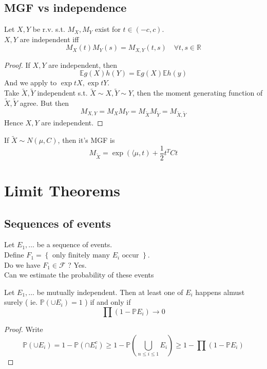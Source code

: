 \documentclass[../main.tex]{subfiles}
\begin{document}
\subsection{MGF vs independence}
\begin{propo}
Let $X,Y$ be r.v. s.t. $M_X,M_Y$ exist for $t\in ( -c,c) $.\\
$X,Y$ are independent iff
\[ 
M_X( t) M_Y( s) = M_{X,Y} ( t,s) \quad \forall t,s\in \mathbb{R}
\]

\end{propo}
\begin{proof}
If $X,Y$ are independent, then 
\[ 
\mathbb{E}g( X) h( Y) = \mathbb{E}g( X) \mathbb{E}h( y) 
\]
And we apply to $\exp tX, \exp tY$.\\
Take $\tilde X, \tilde Y$ independent s.t. $\tilde X\sim X,\tilde Y \sim Y$, then the moment generating function of $\tilde X,\tilde Y$ agree.
But then
\[ 
M_{X,Y} = M_X M_Y= M_{\tilde X} M_{\tilde Y} = M_{\tilde X,\tilde Y} 
\]
Hence $X,Y$ are independent.
\end{proof}
\begin{propo}
If $\tilde X\sim N( \mu,C) $, then it's MGF is
\[ 
M_{\tilde X} = \exp( \langle\mu,t) + \frac{1}{2} t^{T}Ct
\]

\end{propo}
\section{Limit Theorems}
\subsection{Sequences of events}
Let $E_1,\ldots$ be a sequence of events.\\
Define $F_1= \left\{ \text{ only finitely many  } E_i \text{ occur }  \right\} $.\\
Do we have $F_1\in \mathcal{F}$ ?
Yes.\\
Can we estimate the probability of these events
\begin{lemma}
Let $E_1,\ldots$ be mutually independent. Then at least one of $E_i$ happens almust surely ( ie. $\mathbb{P}( \cup E_i) =1$ ) if and only if
\[ 
\prod ( 1- \mathbb{P}E_i) \to 0
\]

\end{lemma}
\begin{proof}
Write
\[ 
\mathbb{P}( \cup E_i) = 1 - \mathbb{P}( \cap E_i^{c}) \geq 1- \mathbb{P}( \bigcup_{ n \leq i \leq 1} E_i) \geq 1- \prod( 1- \mathbb{P}E_i) 
\]

\end{proof}
\end{document}
